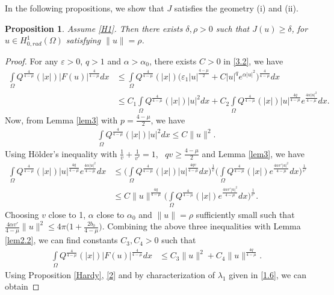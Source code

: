 \documentclass[11pt]{amsart}
\numberwithin{equation}{section}
\newtheorem{prop}[thm]{Proposition}
\newcommand{\hr}{H^1_{0, rad}(\Omega)}
\newcommand{\1}{\frac{1}{2}}
\begin{document}
	In the following propositions, we show that $J$ satisfies the geometry (i) and (ii).
	\begin{prop}
		\label{prop4.2}
		Assume \eqref{H1}. Then there exists $\delta, \rho>0$ such that $J(u)\geq \delta$, for $u\in \hr$ satisfying $\|u\|= \rho$.
	\end{prop}
	\begin{proof}
		For any $\varepsilon>0$, $q>1$ and $\alpha>\alpha_0$, there exists $C>0$ in \eqref{3.2}, we have
		\begin{align}
			\int\limits_\Omega Q^{\frac{4}{4-\mu}}(|x|)|F(u)|^{\frac{4}{4-\mu}}dx &\leq \int\limits_\Omega Q^{\frac{4}{4-\mu}}(|x|) \Bigg(\varepsilon_1 |u|^{\frac{4-\mu}{2}} + C|u|^q e^{\alpha |u|^2}\Bigg)^{\frac{4}{4-\mu}} dx\nonumber\\
			&\leq C_1 \int\limits_\Omega Q^{\frac{4}{4-\mu}}(|x|) |u|^2 dx +C_2 \int\limits_\Omega Q^{\frac{4}{4-\mu}}(|x|) |u|^{\frac{4q}{4-\mu}} e^{\frac{4\alpha |u|^2}{4-\mu}} dx.\nonumber
		\end{align}
		Now, from Lemma \ref{lem3} with $p= \frac{4-\mu}{2}$, we have
		\begin{align*}
			\int\limits_\Omega Q^{\frac{4}{4-\mu}}(|x|) |u|^2 dx \leq C \|u\|^2.
		\end{align*}
		Using H\"older's inequality with $\frac{1}{v}+\frac{1}{v'}=1$, \ $qv\geq \frac{4-\mu}{2}$ and Lemma \ref{lem3}, we have
		\begin{align*}
			\int\limits_\Omega Q^{\frac{4}{4-\mu}}(|x|) |u|^{\frac{4q}{4-\mu}} e^{\frac{4\alpha |u|^2}{4-\mu}} dx &\leq \Bigg( \int\limits_\Omega Q^{\frac{4}{4-\mu}}(|x|) |u|^{\frac{4qv}{4-\mu}} dx\Bigg)^{\frac{1}{v}} \Bigg( \int\limits_\Omega Q^{\frac{4}{4-\mu}}(|x|) e^{\frac{4\alpha v' |u|^2}{4-\mu}} dx\Bigg)^{\frac{1}{v'}}\\
			&\leq C\|u\|^{\frac{4q}{4-\mu}}\Bigg( \int\limits_\Omega Q^{\frac{4}{4-\mu}}(|x|) e^{\frac{4\alpha v' |u|^2}{4-\mu}} dx\Bigg)^{\frac{1}{v'}}.
		\end{align*}
		Choosing $v$ close to 1, $\alpha$ close to $\alpha_0$ and $\|u\|=\rho$ sufficiently small such that
		$\frac{4\alpha v'}{4-\mu}\|u\|^2 \leq 4\pi \Bigg(1+\frac{2b_0}{4-\mu}\Bigg)$. Combining the above three inequalities with Lemma \ref{lem2.2}, we can find constants $C_3, C_4 >0$ such that
		\begin{align}
			\int\limits_\Omega Q^{\frac{4}{4-\mu}}(|x|)|F(u)|^{\frac{4}{4-\mu}}dx &\leq C_3 \|u\|^2+ C_4 \|u\|^{\frac{4q}{4-\mu}}. \label{2}
		\end{align}
		Using Proposition \ref{Hardy}, \eqref{2} and by characterization of $\lambda_1$ given in \eqref{1.6}, we can obtain

\end{proof}
\end{document}
